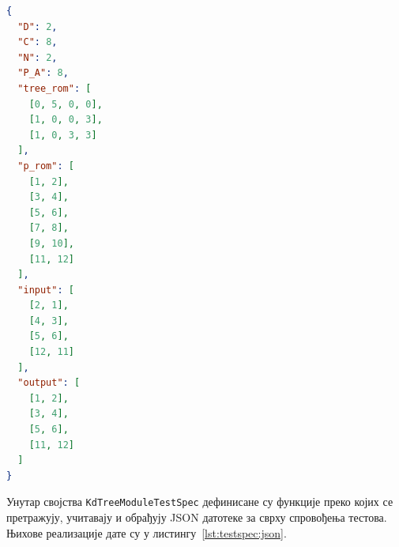 \documentclass[master]{finthesis}
\newcommand*{\kd}{\texorpdfstring{$k$}{k}-д }
\newcommand*{\prog}[1]{\texttt{#1}}
\begin{document}
\begin{lstlisting}[language=JSON, caption={Пример структуре JSON датотеке која је спецификација теста модула за претраживање \kd стабла.}, label={lst:jsonfile}]
{
  "D": 2,
  "C": 8,
  "N": 2,
  "P_A": 8,
  "tree_rom": [
    [0, 5, 0, 0],
    [1, 0, 0, 3],
    [1, 0, 3, 3]
  ],
  "p_rom": [
    [1, 2],
    [3, 4],
    [5, 6],
    [7, 8],
    [9, 10],
    [11, 12]
  ],
  "input": [
    [2, 1],
    [4, 3],
    [5, 6],
    [12, 11]
  ],
  "output": [
    [1, 2],
    [3, 4],
    [5, 6],
    [11, 12]
  ]
}
\end{lstlisting}

Унутар својства \prog{KdTreeModuleTestSpec} дефинисане су функције преко којих се претражују, учитавају и обрађују JSON датотеке за сврху спровођења тестова. Њихове реализације дате су у листингу~\ref{lst:testspec:json}.
\end{document}
